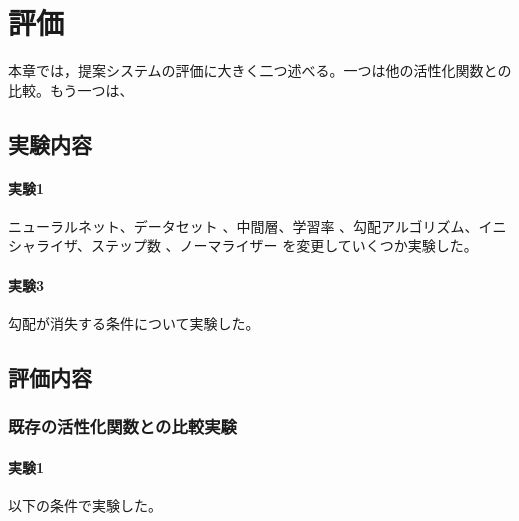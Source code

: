 \chapter{評価}
\label{evaluation}
本章では，提案システムの評価に大きく二つ述べる。一つは他の活性化関数との比較。もう一つは、

\section{実験内容}
\subsubsection{実験1}

ニューラルネット、データセット 、中間層、学習率 、勾配アルゴリズム、イニシャライザ、ステップ数 、ノーマライザー
を変更していくつか実験した。

\subsubsection{実験3}
勾配が消失する条件について実験した。




\section{評価内容}



\subsection{既存の活性化関数との比較実験}



\subsubsection{実験1}

以下の条件で実験した。

